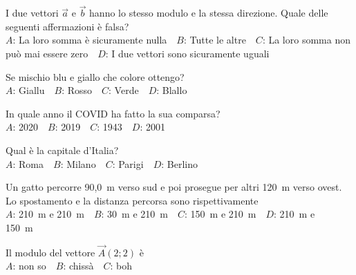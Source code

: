 \mcquestionfooter



\def\mcquestionnumber{11}


\mcquestionheader I due vettori $\vec{a}$ e $\vec{b}$ hanno lo stesso modulo e la stessa direzione. Quale delle seguenti affermazioni è falsa?\\
{$A$}: La loro somma è sicuramente nulla\ \ {$B$}: Tutte le altre\ \ {$C$}: La loro somma non può mai essere zero\ \ {$D$}: I due vettori sono sicuramente uguali\ \ 

\mcquestionfooter



\def\mcquestionnumber{12}


\mcquestionheader Se mischio blu e giallo che colore ottengo?\\
{$A$}: Giallu\ \ {$B$}: Rosso\ \ {$C$}: Verde\ \ {$D$}: Blallo\ \ 

\mcquestionfooter



\mcpaperfooter

\def\mcserialnumber{29}
\mcpaperheader


\def\mcquestionnumber{1}


\mcquestionheader In quale anno il COVID ha fatto la sua comparsa?\\
{$A$}: 2020\ \ {$B$}: 2019\ \ {$C$}: 1943\ \ {$D$}: 2001\ \ 

\mcquestionfooter



\def\mcquestionnumber{2}


\mcquestionheader Qual è la capitale d’Italia?\\
{$A$}: Roma\ \ {$B$}: Milano\ \ {$C$}: Parigi\ \ {$D$}: Berlino\ \ 

\mcquestionfooter



\def\mcquestionnumber{3}


\mcquestionheader Un gatto percorre 90,0~m verso sud e poi prosegue per altri 120~m verso ovest. Lo spostamento e la distanza percorsa sono rispettivamente\\
{$A$}: 210~m e 210~m\ \ {$B$}: 30~m e 210~m\ \ {$C$}: 150~m e 210~m\ \ {$D$}: 210~m e 150~m\ \ 

\mcquestionfooter



\def\mcquestionnumber{4}


\mcquestionheader Il modulo del vettore $\vec{A}(2;2)$ è\\
{$A$}: non so\ \ {$B$}: chissà\ \ {$C$}: boh\ \ 

